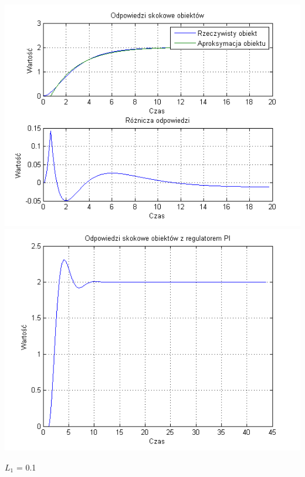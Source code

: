\documentclass[10pt,a4paper]{article}
\begin{document}
\begin{center}
\includegraphics[scale=1]{images/jeden/skrypt_175.png}\\
\includegraphics[scale=1]{images/jeden/skrypt_176.png}\\
\end{center}
\newpage
$L_1$ = 0.1
\end{document}
